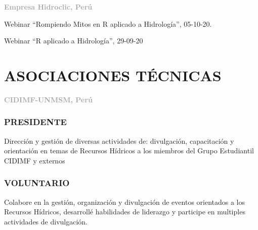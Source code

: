 \documentclass[
  10,
]{article}
\begin{document}
\textcolor{darkgray}{\textbf{Empresa Hidroclic, Perú}}

Webinar ``Rompiendo Mitos en R aplicado a Hidrología'', 05-10-20.

Webinar ``R aplicado a Hidrología'', 29-09-20

\hypertarget{asociaciones-tuxe9cnicas}{%
\section{ASOCIACIONES TÉCNICAS}\label{asociaciones-tuxe9cnicas}}

\textcolor{darkgray}{\textbf{CIDIMF-UNMSM, Perú}}

\hypertarget{presidente}{%
\subsubsection{PRESIDENTE}\label{presidente}}

Dirección y gestión de diversas actividades de: divulgación,
capacitación y orientación en temas de Recursos Hídricos a los miembros
del Grupo Estudiantil CIDIMF y externos

\hypertarget{voluntario-1}{%
\subsubsection{VOLUNTARIO}\label{voluntario-1}}

Colabore en la gestión, organización y divulgación de eventos orientados
a los Recursos Hídricos, desarrollé habilidades de liderazgo y participe
en multiples actividades de divulgación.
\end{document}
